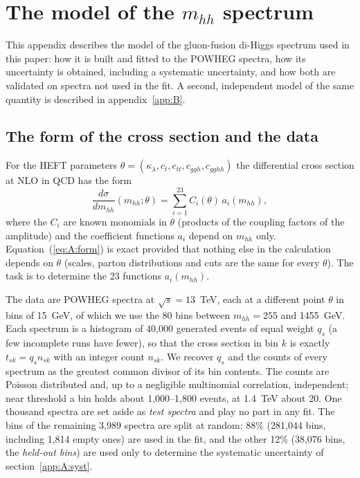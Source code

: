 \section{The model of the $m_{hh}$ spectrum}
\label{app:A}

This appendix describes the model of the gluon-fusion di-Higgs spectrum used in this paper: how it
is built and fitted to the POWHEG spectra, how its uncertainty is obtained, including a systematic
uncertainty, and how both are validated on spectra not used in the fit. A second, independent model
of the same quantity is described in appendix~\ref{app:B}.

\subsection{The form of the cross section and the data}
\label{app:A:data}

For the HEFT parameters $\theta = (\kappa_\lambda, c_t, c_{tt}, c_{ggh}, c_{gghh})$ the differential cross
section at NLO in QCD has the form~\cite{Buchalla:2018yce,Alasfar:2023xpc}
\begin{equation}
  \frac{d\sigma}{dm_{hh}}(m_{hh};\theta) = \sum_{i=1}^{23} C_i(\theta)\, a_i(m_{hh}),
  \label{eq:A:form}
\end{equation}
where the $C_i$ are known monomials in $\theta$ (products of the coupling factors of the amplitude) and
the coefficient functions $a_i$ depend on $m_{hh}$ only. Equation~(\ref{eq:A:form}) is exact provided that
nothing else in the calculation depends on $\theta$ (scales, parton distributions and cuts are the same
for every $\theta$). The task is to determine the 23 functions $a_i(m_{hh})$.

The data are POWHEG spectra at $\sqrt{s} = 13$~TeV, each at a different point $\theta$ %
in bins of 15~GeV, of which we use the 80 bins between $m_{hh} = 255$ and 1455~GeV. Each spectrum
is a histogram of 40,000 generated events of equal weight $q_s$ (a few incomplete runs have fewer),
so that the cross section in bin $k$ is exactly $t_{sk} = q_s n_{sk}$ with an integer count $n_{sk}$. We
recover $q_s$ and the counts of every spectrum as the greatest common divisor of its bin contents. The
counts are Poisson distributed and, up to a negligible multinomial correlation, independent; near
threshold a bin holds about 1,000--1,800 events, at 1.4~TeV about 20. One thousand spectra are set aside
as \emph{test spectra} and play no part in any fit. The bins of the remaining 3,989 spectra are split at
random: 88\% (281,044 bins, including 1,814 empty ones) are used in the fit, and the other 12\% (38,076
bins, the \emph{held-out bins}) are used only to determine the systematic uncertainty of
section~\ref{app:A:syst}.

